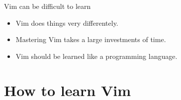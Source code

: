 \documentclass{beamer}
\begin{document}
    \begin{frame}{Vim can be difficult to learn}
        \begin{itemize}
            \item Vim does things very differentely.
            \item Mastering Vim takes a large investments of time.
            \item Vim should be learned like a programming language.
        \end{itemize}
    \end{frame}
    \section{How to learn Vim}
\end{document}
